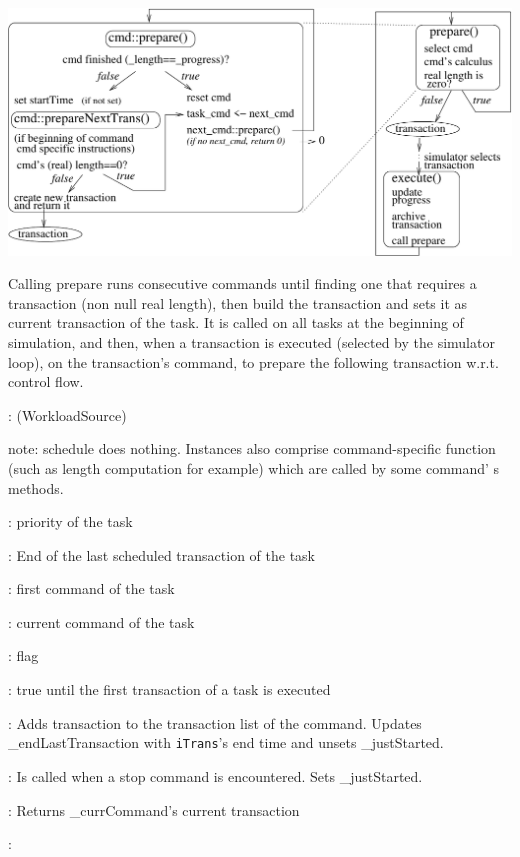 \documentclass[a4paper,11pt]{article}
\newcommand{\bfont}{\fontseries{b}\selectfont}
\newcommand{\cod}[1]{{\ttfamily #1}}
\newcommand{\class}[2]{\par\vspace{1mm}\hspace{-5mm}\large\colorbox{file}{\textbullet\bfont\cod{#1}:} (\cod{#2})\par}
\newcommand{\method}[1]{\par\vspace{1mm}\hspace{-2mm}\colorbox{method}{\textopenbullet\bfont\cod{#1}:}}
\newcommand{\variable}[1]{\par\vspace{1mm}\hspace{-2mm}\colorbox{variable}{\textopenbullet\bfont\cod{#1}:}}
\begin{document}
\vspace{1.5mm}\noindent
\includegraphics[width=15.5cm]{images/prepare.pdf}

\vspace{1.5mm}\noindent
Calling \cod{prepare} runs consecutive commands until finding one that requires a transaction (non null real length), then build the transaction and sets it as current transaction of the task. It is called on all tasks at the beginning of simulation, and then, when a transaction is executed (selected by the simulator loop), on the transaction's command, to prepare the following transaction w.r.t. control flow.
\class{Task}{WorkloadSource}
note: \cod{schedule} does nothing. Instances also comprise command-specific function (such as length computation for example) which are called by some command' s methods.

\variable{\_priority} priority of the task
\variable{\_endLastTransaction} End of the last scheduled transaction of the task
\variable{\_firstCommand} first command of the task
\variable{\_currCommand} current command of the task
\variable{\_isDaemon} flag
\variable{\_justStarted} true until the first transaction of a task is executed
\method{addTransaction(iTrans)} Adds transaction to the transaction list of the command. Updates \cod{\_endLastTransaction} with {\tt iTrans}'s end time and unsets \cod{\_justStarted}.
\method{finished()} Is called when a stop command is encountered. Sets \cod{\_justStarted}.
\method{getNextTransaction(iEndSchedule)} Returns \cod{\_currCommand}'s current transaction
\method{getCPU(),getFPGA()}
\end{document}
